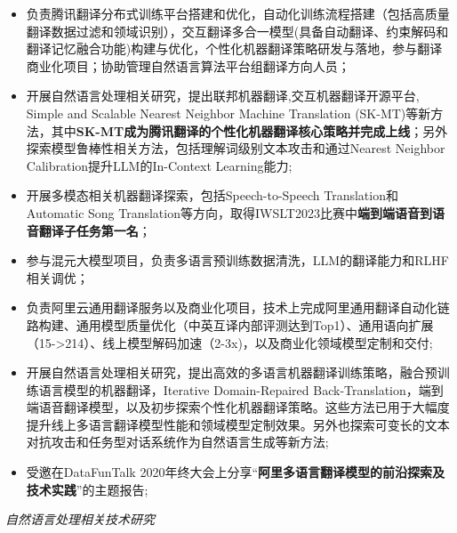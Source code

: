 \documentclass{resume}
\begin{document}
\begin{itemize}
  \item 负责腾讯翻译分布式训练平台搭建和优化，自动化训练流程搭建（包括高质量翻译数据过滤和领域识别），交互翻译多合一模型(具备自动翻译、约束解码和翻译记忆融合功能)构建与优化，个性化机器翻译策略研发与落地，参与翻译商业化项目；协助管理自然语言算法平台组翻译方向人员；
  \item 开展自然语言处理相关研究，提出联邦机器翻译,交互机器翻译开源平台, Simple and Scalable Nearest Neighbor Machine Translation (SK-MT)等新方法，其中\textbf{SK-MT成为腾讯翻译的个性化机器翻译核心策略并完成上线}；另外探索模型鲁棒性相关方法，包括理解词级别文本攻击和通过Nearest Neighbor Calibration提升LLM的In-Context Learning能力; 
  \item 开展多模态相关机器翻译探索，包括Speech-to-Speech Translation和Automatic Song Translation等方向，取得IWSLT2023比赛中\textbf{端到端语音到语音翻译子任务第一名}；
  \item 参与混元大模型项目，负责多语言预训练数据清洗，LLM的翻译能力和RLHF相关调优；
\end{itemize}

\begin{itemize}
  \item 负责阿里云通用翻译服务以及商业化项目，技术上完成阿里通用翻译自动化链路构建、通用模型质量优化（中英互译内部评测达到Top1）、通用语向扩展（15->214）、线上模型解码加速（2-3x)，以及商业化领域模型定制和交付;
  \item 开展自然语言处理相关研究，提出高效的多语言机器翻译训练策略，融合预训练语言模型的机器翻译，Iterative Domain-Repaired Back-Translation，端到端语音翻译模型，以及初步探索个性化机器翻译策略。这些方法已用于大幅度提升线上多语言翻译模型性能和领域模型定制效果。另外也探索可变长的文本对抗攻击和任务型对话系统作为自然语言生成等新方法;
  \item 受邀在DataFunTalk 2020年终大会上分享“\textbf{阿里多语言翻译模型的前沿探索及技术实践}”的主题报告;
\end{itemize}

\textit{自然语言处理相关技术研究}
\end{document}
